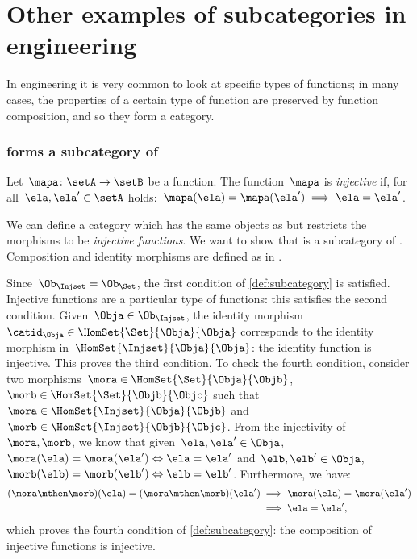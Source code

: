 \section{Other examples of subcategories in engineering}

In engineering it is very common to look at specific types of functions; in many cases, the properties of a certain type of function are preserved by function composition, and so they form a category.

\subsubsection{\Injset forms a subcategory of \Set}
\begin{definition}
  \label{def:injective-function}
  Let~$\mapa \colon \setA\to \setB$ be a function. The function~$\mapa$ is \emph{injective} if, for all~$\ela,\ela'\in \setA$ holds:~$\mapa(\ela)=\mapa(\ela')\implies \ela=\ela'$.
\end{definition}


\begin{example}
  We can define a category \iindex{\Injset} which has the same objects as \Set but restricts the morphisms to be \emph{injective functions}.
  We want to show that \Injset is a subcategory of \Set. Composition and identity morphisms are defined as in \Set.

  Since~$\Ob_{\Injset}=\Ob_{\Set}$, the first condition of \cref{def:subcategory} is satisfied. Injective functions are a particular type of functions: this satisfies the second condition. Given~$\Obja\in \Ob_{\Injset}$, the identity morphism~$\catid_\Obja\in \HomSet{\Set}{\Obja}{\Obja}$ corresponds to the identity morphism in~$\HomSet{\Injset}{\Obja}{\Obja}$: the identity function is injective. This proves the third condition. To check the fourth condition, consider two morphisms~$\mora \in \HomSet{\Set}{\Obja}{\Objb}$,~$\morb \in \HomSet{\Set}{\Objb}{\Objc}$ such that~$\mora \in \HomSet{\Injset}{\Obja}{\Objb}$ and~$\morb\in \HomSet{\Injset}{\Objb}{\Objc}$. From the injectivity of~$\mora,\morb$, we know that given~$\ela,\ela'\in \Obja$, $\mora(\ela)=\mora(\ela') \Leftrightarrow \ela=\ela'$ and~$\elb,\elb'\in \Obja$,~$\morb(\elb)=\morb(\elb') \Leftrightarrow \elb=\elb'$. Furthermore, we have:
  \begin{equation*}
    \begin{aligned}
    (\mora \mthen \morb)(\ela)
      =(\mora \mthen \morb)(\ela')&\implies \mora(\ela)=\mora(\ela')\\
      &\implies \ela=\ela',
    \end{aligned}
  \end{equation*}
  which proves the fourth condition of \cref{def:subcategory}: the composition of injective functions is injective.
\end{example}



